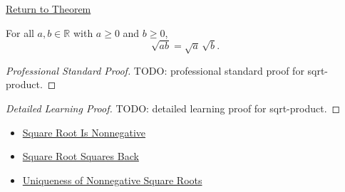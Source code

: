 \newpage
{}
\label{prf:sqrt-product}

\begin{remark*}[Return]
\hyperref[thm:sqrt-product]{Return to Theorem}
\end{remark*}

\begin{theorem*}
For all $a,b\in\mathbb{R}$ with $a\ge0$ and $b\ge0$,
\[
\sqrt{ab}=\sqrt a\,\sqrt b.
\]
\end{theorem*}

\begin{proof}[Professional Standard Proof]
\LRAProofBodyStart
TODO: professional standard proof for sqrt-product.
\end{proof}

\begin{proof}[Detailed Learning Proof]
\LRAProofBodyStart
TODO: detailed learning proof for sqrt-product.
\end{proof}

\begin{remark*}
\end{remark*}

\begin{dependencies}
\begin{itemize}
  \item \hyperref[thm:sqrt-nonnegative]{Square Root Is Nonnegative}
  \item \hyperref[thm:sqrt-square]{Square Root Squares Back}
  \item \hyperref[thm:uniqueness-of-nonnegative-square-roots]{Uniqueness of Nonnegative Square Roots}
\end{itemize}
\end{dependencies}

\clearpage
